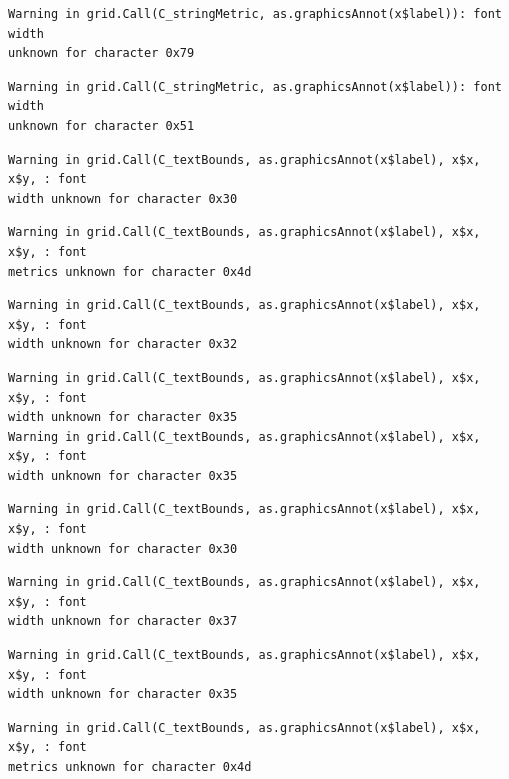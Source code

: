 \documentclass[
  letterpaper,
]{scrbook}
\begin{document}
\begin{verbatim}
Warning in grid.Call(C_stringMetric, as.graphicsAnnot(x$label)): font width
unknown for character 0x79
\end{verbatim}

\begin{verbatim}
Warning in grid.Call(C_stringMetric, as.graphicsAnnot(x$label)): font width
unknown for character 0x51
\end{verbatim}

\begin{verbatim}
Warning in grid.Call(C_textBounds, as.graphicsAnnot(x$label), x$x, x$y, : font
width unknown for character 0x30
\end{verbatim}

\begin{verbatim}
Warning in grid.Call(C_textBounds, as.graphicsAnnot(x$label), x$x, x$y, : font
metrics unknown for character 0x4d
\end{verbatim}

\begin{verbatim}
Warning in grid.Call(C_textBounds, as.graphicsAnnot(x$label), x$x, x$y, : font
width unknown for character 0x32
\end{verbatim}

\begin{verbatim}
Warning in grid.Call(C_textBounds, as.graphicsAnnot(x$label), x$x, x$y, : font
width unknown for character 0x35
Warning in grid.Call(C_textBounds, as.graphicsAnnot(x$label), x$x, x$y, : font
width unknown for character 0x35
\end{verbatim}

\begin{verbatim}
Warning in grid.Call(C_textBounds, as.graphicsAnnot(x$label), x$x, x$y, : font
width unknown for character 0x30
\end{verbatim}

\begin{verbatim}
Warning in grid.Call(C_textBounds, as.graphicsAnnot(x$label), x$x, x$y, : font
width unknown for character 0x37
\end{verbatim}

\begin{verbatim}
Warning in grid.Call(C_textBounds, as.graphicsAnnot(x$label), x$x, x$y, : font
width unknown for character 0x35
\end{verbatim}

\begin{verbatim}
Warning in grid.Call(C_textBounds, as.graphicsAnnot(x$label), x$x, x$y, : font
metrics unknown for character 0x4d
\end{verbatim}
\end{document}
